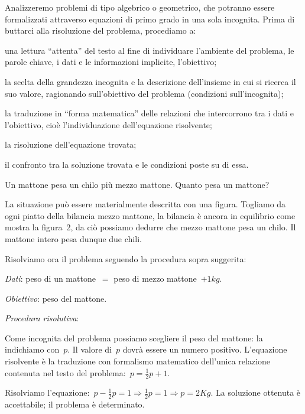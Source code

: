 Analizzeremo problemi di tipo algebrico o geometrico, che potranno
essere formalizzati attraverso equazioni di primo grado in una sola
incognita. Prima di buttarci alla risoluzione del problema, procediamo
a:

\begin{enumeratea}
\item una lettura ``attenta'' del
testo al fine di individuare l'ambiente del problema,
le parole chiave, i dati e le informazioni implicite,
l'obiettivo;
\item la scelta della grandezza incognita e la descrizione
dell'insieme in cui si ricerca il suo valore,
ragionando sull'obiettivo del problema (condizioni sull'incognita);
\item la traduzione in ``forma matematica'' delle relazioni che intercorrono tra 
i
dati e l'obiettivo, cioè l'individuazione dell'equazione risolvente;
\item la risoluzione dell'equazione trovata;
\item il confronto tra la soluzione trovata e le condizioni poste su di essa.
\end{enumeratea}

\begin{problema}
 Un mattone pesa un chilo più mezzo mattone. Quanto pesa un mattone?
\end{problema}

\begin{soluzione}
 La situazione può essere materialmente descritta con una figura.
Togliamo da ogni piatto della bilancia mezzo mattone, la bilancia è
ancora in equilibrio come mostra la figura~2, da ciò possiamo
dedurre che mezzo mattone pesa un chilo. Il mattone intero pesa dunque
due chili.
\begin{center}
 
\end{center}

Risolviamo ora il problema seguendo la procedura sopra suggerita:

\emph{Dati}: peso di un mattone~$=$ peso di mezzo mattone~$+ 1\unit{kg}.$

\emph{Obiettivo}: peso del mattone.

\emph{Procedura risolutiva}:

Come incognita del problema possiamo scegliere il peso del mattone: la
indichiamo con~$p$.
Il valore di~$p$ dovrà essere un numero positivo.
L'equazione risolvente è la traduzione con formalismo
matematico dell'unica relazione contenuta nel testo del
problema:~$p=\frac{1}{2}p+1$.

Risolviamo l'equazione:~$p-\frac{1}{2}p=1\Rightarrow\frac{1}{2}p=1\Rightarrow 
p=2\unit{Kg}.$
La soluzione ottenuta è accettabile; il problema è determinato.
\end{soluzione}

